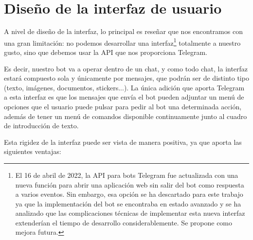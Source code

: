 \chapter{Diseño de la interfaz de usuario}

A nivel de diseño de la interfaz, lo principal es reseñar que nos encontramos con una gran limitación: no podemos desarrollar una interfaz\footnote{El 16 de abril de 2022, la API para bots Telegram fue actualizada\cite{telegramWebappUpdate} con una nueva función para abrir una aplicación web sin salir del bot como respuesta a varios eventos. Sin embargo, esa opción se ha descartado para este trabajo ya que la implementación del bot se encontraba en estado avanzado y se ha analizado que las complicaciones técnicas de implementar esta nueva interfaz extenderían el tiempo de desarrollo considerablemente. Se propone como mejora futura.} totalmente a nuestro gusto, sino que debemos usar la API que nos proporciona Telegram.

Es decir, nuestro bot va a operar dentro de un chat, y como todo chat, la interfaz estará compuesto sola y únicamente por mensajes, que podrán ser de distinto tipo (texto, imágenes, documentos, stickers...). La única adición que aporta Telegram a esta interfaz es que los mensajes que envía el bot pueden adjuntar un menú de opciones que el usuario puede pulsar para pedir al bot una determinada acción, además de tener un menú de comandos disponible continuamente junto al cuadro de introducción de texto.

Esta rigidez de la interfaz puede ser vista de manera positiva, ya que aporta las siguientes ventajas:

